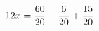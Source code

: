 \documentclass[preview]{standalone}
\begin{document}
\begin{align*}
\special{dvisvgm:raw <g id='unique000'>}12 x = \frac{60}{20} - \frac{6}{20} + \frac{15}{20}\special{dvisvgm:raw </g>}
\end{align*}
\end{document}
